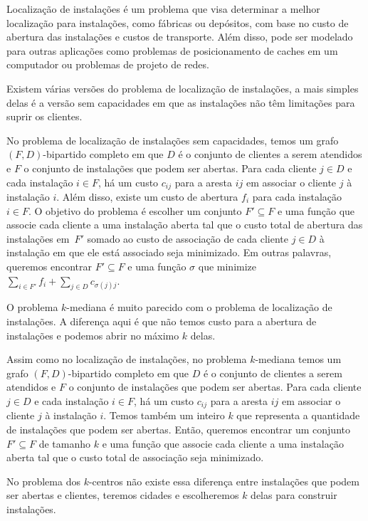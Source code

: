 \documentclass[12pt]{article}
\begin{document}
Localização de instalações é um problema que visa determinar a melhor localização para instalações, como fábricas ou depósitos, com base no custo de abertura das instalações e custos de transporte. Além disso, pode ser modelado para outras aplicações como problemas de posicionamento de caches em um computador ou problemas de projeto de redes.

Existem várias versões do problema de localização de instalações, a mais simples delas é a versão sem capacidades em que as instalações não têm limitações para suprir os clientes.

No problema de localização de instalações sem capacidades, temos um grafo $(F,D)$-bipartido completo em que $D$ é o conjunto de clientes a serem atendidos e $F$ o conjunto de instalações que podem ser abertas. Para cada cliente $j \in D$ e cada instalação $i \in F$, há um custo $c_{ij}$ para a aresta $ij$ em associar o cliente $j$ à instalação $i$. Além disso, existe um custo de abertura $f_i$ para cada instalação $i \in F$. O objetivo do problema é escolher um conjunto $F' \subseteq F$ e uma função que associe cada cliente a uma instalação aberta tal que o custo total de abertura das instalações em~$F'$ somado ao custo de associação de cada cliente $j \in D$ à instalação em que ele está associado seja minimizado. Em outras palavras, queremos encontrar $F' \subseteq F$ e uma função $\sigma$ que minimize $\sum_{i\in F'} f_i + \sum_{j \in D} c_{\sigma(j)j}$. 

O problema $k$-mediana é muito parecido com o problema de localização de instalações. A diferença aqui é que não temos custo para a abertura de instalações e podemos abrir no máximo $k$ delas.
 
Assim como no localização de instalações, no problema $k$-mediana temos um grafo $(F,D)$-bipartido completo em que $D$ é o conjunto de clientes a serem atendidos e $F$ o conjunto de instalações que podem ser abertas. Para cada cliente $j \in D$ e cada instalação $i \in F$, há um custo $c_{ij}$ para a aresta $ij$ em associar o cliente $j$ à instalação $i$. Temos também um inteiro $k$ que representa a quantidade de instalações que podem ser abertas. Então, queremos encontrar um conjunto $F' \subseteq F$ de tamanho $k$ e uma função que associe cada cliente a uma instalação aberta tal que o custo total de associação seja minimizado.

No problema dos $k$-centros não existe essa diferença entre instalações que podem ser abertas e clientes, teremos cidades e escolheremos $k$ delas para construir instalações.
\end{document}
